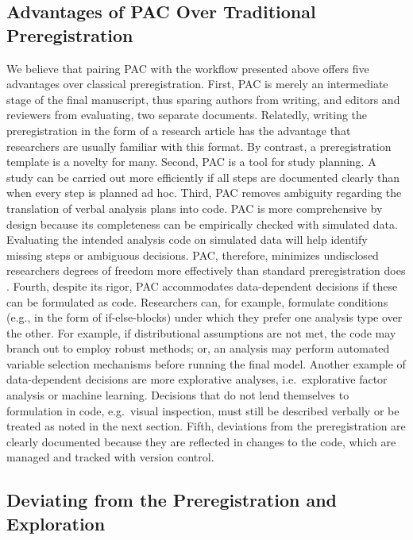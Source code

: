 \documentclass[psych,tutorial,submit,moreauthors,pdftex]{mdpi}
\begin{document}
\hypertarget{advantages-of-pac-over-traditional-preregistration}{%
\subsection{Advantages of PAC Over Traditional
Preregistration}\label{advantages-of-pac-over-traditional-preregistration}}

We believe that pairing PAC with the workflow presented above offers
five advantages over classical preregistration. First, PAC is merely an
intermediate stage of the final manuscript, thus sparing authors from
writing, and editors and reviewers from evaluating, two separate
documents. Relatedly, writing the preregistration in the form of a
research article has the advantage that researchers are usually familiar
with this format. By contrast, a preregistration template is a novelty
for many. Second, PAC is a tool for study planning. A study can be
carried out more efficiently if all steps are documented clearly than
when every step is planned ad hoc. Third, PAC removes ambiguity
regarding the translation of verbal analysis plans into code. PAC is
more comprehensive by design because its completeness can be empirically
checked with simulated data. Evaluating the intended analysis code on
simulated data will help identify missing steps or ambiguous decisions.
PAC, therefore, minimizes undisclosed researchers degrees of freedom
more effectively than standard preregistration does
\citep{bakkerEnsuringQualitySpecificity2020, wichertsDegreesFreedomPlanning2016}.
Fourth, despite its rigor, PAC accommodates data-dependent decisions if
these can be formulated as code. Researchers can, for example, formulate
conditions (e.g., in the form of if-else-blocks) under which they prefer
one analysis type over the other. For example, if distributional
assumptions are not met, the code may branch out to employ robust
methods; or, an analysis may perform automated variable selection
mechanisms before running the final model. Another example of
data-dependent decisions are more explorative analyses, i.e.~explorative
factor analysis or machine learning. Decisions that do not lend
themselves to formulation in code, e.g.~visual inspection, must still be
described verbally or be treated as noted in the next section. Fifth,
deviations from the preregistration are clearly documented because they
are reflected in changes to the code, which are managed and tracked with
version control.

\hypertarget{deviating-from-the-preregistration-and-exploration}{%
\subsection{Deviating from the Preregistration and
Exploration}\label{deviating-from-the-preregistration-and-exploration}}
\end{document}
